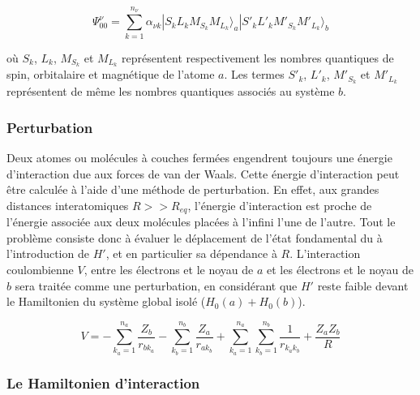 	\begin{equation}
	\Psi_{00}^{\nu} = \sum_{k=1}^{n_{\nu}} \alpha_{\nu k}| S_{k} L_{k} M_{S_{k}} M_{L_{k}} \rangle _{a} | S'_{k} L'_{k} M'_{S_{k}} M'_{L_{k}} \rangle _{b}
	\end{equation}
	
	\noindent où $S_{k}$, $L_{k}$, $M_{S_{k}}$ et $M_{L_{k}}$ représentent respectivement les nombres quantiques de spin, orbitalaire et magnétique de l'atome $a$. Les termes $S'_{k}$, $L'_{k}$, $M'_{S_{k}}$ et $M'_{L_{k}}$ représentent de même les nombres quantiques associés au système $b$.
	
	\subsubsection{Perturbation}
	
	Deux atomes ou molécules à couches fermées engendrent toujours une énergie d'interaction due aux forces de van der Waals. Cette énergie d'interaction peut être calculée à l'aide d'une méthode de perturbation. En effet, aux grandes distances interatomiques $R>>R_{eq}$, l'énergie d'interaction est proche de l'énergie associée aux deux molécules placées à l'infini l'une de l'autre.  
	Tout le problème consiste donc à évaluer le déplacement de l'état fondamental du à l'introduction de $H'$, et en particulier sa dépendance à $R$. L'interaction coulombienne $V$, entre les électrons et le noyau de $a$ et les électrons et le noyau de $b$ sera traitée comme une perturbation, en considérant que $H'$ reste faible devant le Hamiltonien du système global isolé ($H_{0}(a)+ H_{0}(b)$). 
	
	
	\begin{equation}
	V = - \sum_{k_{a}=1}^{n_{a}} \frac{Z_{b}}{r_{bk_{a}}} - \sum_{k_{b}=1}^{n_{b}} \frac{Z_{a}}{r_{ak_{b}}} + \sum_{k_{a}=1}^{n_{a}} \sum_{k_{b}=1}^{n_{b}} \frac{1}{r_{k_{a}k_{b}}} + \frac{Z_{a} Z_{b}}{R}
	\end{equation}
	
	\subsubsection{Le Hamiltonien d'interaction}
	
